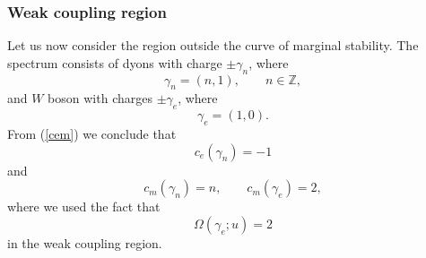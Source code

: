 \documentclass[a4paper,11pt]{article}
\theoremstyle{definition}
\def\IZ{{\mathbb Z}}
\def\IZ{\mathbb{Z}}
\begin{document}

\subsubsection{Weak coupling region}

Let us now consider the region outside the curve of marginal
stability. The spectrum consists of dyons with charge $\pm \gamma_n$,
where
%
\begin{equation}
  \gamma_n= (n,1), \qquad n \in \IZ, 
\end{equation}
%
and $W$ boson with charges $\pm \gamma_e$, where
%
\begin{equation}
  \gamma_e=(1,0). 
\end{equation}
%
From (\ref{cem}) we conclude that
%
\begin{equation}
  c_e(\gamma_n)=-1
\end{equation}
%
and
%
\begin{equation}
  c_m(\gamma_n)=n, \qquad c_m(\gamma_e)=2, 
\end{equation}
%
where we used the fact that 
%
\begin{equation}
\Omega(\gamma_e;u)=2
\end{equation}
%
in the weak coupling region.
\end{document}
